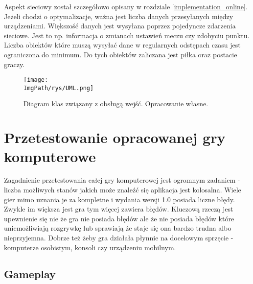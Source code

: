 \documentclass[a4paper,12pt,twoside,openany]{report}
\newcommand{\ImgPath}{.}
\begin{document}
Aspekt sieciowy został szczegółowo opisany w rozdziale \ref{implementation_online}. Jeżeli chodzi o optymalizacje, ważna jest liczba danych przesyłanych między urządzeniami. Większość danych jest wysyłana poprzez pojedyncze zdarzenia sieciowe. Jest to np. informacja o zmianach ustawień meczu czy zdobyciu punktu. Liczba obiektów które muszą wysyłać dane w regularnych odstępach czasu jest ograniczona do minimum. Do tych obiektów zaliczana jest piłka oraz postacie graczy.


\begin{figure}[b]
	\begin{center}
\centering
\texttt{[image: \\ImgPath/rys/UML.png]}
\end{center}
	\caption{Diagram klas związany z obsługą wejść. Opracowanie własne.}
	\label{UML_Input}
\end{figure}


\chapter{Przetestowanie opracowanej gry komputerowe}

Zagadnienie przetestowania całej gry komputerowej jest ogromnym zadaniem - liczba możliwych stanów jakich może znaleźć się aplikacja jest kolosalna. Wiele gier mimo uznania je za kompletne i wydania wersji 1.0 posiada liczne błędy. Zwykle im większa jest gra tym więcej zawiera błędów. Kluczową rzeczą jest upewnienie się nie że gra nie posiada błędów ale że nie posiada błędów które uniemożliwiają rozgrywkę lub sprawiają że staje się ona bardzo trudna albo nieprzyjemna. Dobrze też żeby gra działała płynnie na docelowym sprzęcie - komputerze osobistym, konsoli czy urządzeniu mobilnym. 


\section{Gameplay}
\end{document}
